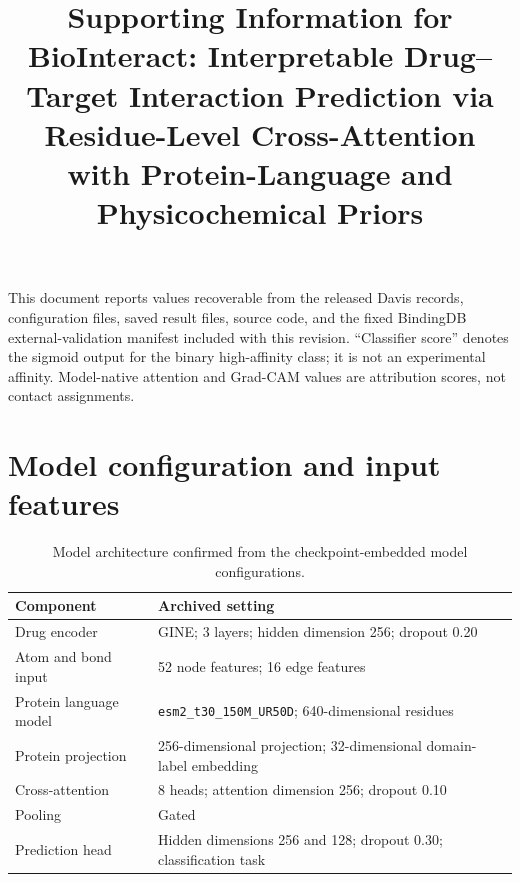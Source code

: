\documentclass[11pt]{article}
\title{Supporting Information for\\
BioInteract: Interpretable Drug--Target Interaction Prediction via Residue-Level Cross-Attention with Protein-Language and Physicochemical Priors}
\author{ }
\date{ }
\begin{document}
\maketitle

\noindent This document reports values recoverable from the released Davis
records, configuration files, saved result files, source code, and the fixed
BindingDB external-validation manifest included with this revision. ``Classifier
score'' denotes the sigmoid output for the binary high-affinity class; it is not
an experimental affinity. Model-native attention and Grad-CAM values are
attribution scores, not contact assignments.

\section*{Model configuration and input features}

\begin{table}[H]
\centering
\caption{Model architecture confirmed from the checkpoint-embedded model configurations.}
\begin{tabular}{ll}
\toprule
Component & Archived setting \\
\midrule
Drug encoder & GINE; 3 layers; hidden dimension 256; dropout 0.20 \\
Atom and bond input & 52 node features; 16 edge features \\
Protein language model & \texttt{esm2\_t30\_150M\_UR50D}; 640-dimensional residues \\
Protein projection & 256-dimensional projection; 32-dimensional domain-label embedding \\
Cross-attention & 8 heads; attention dimension 256; dropout 0.10 \\
Pooling & Gated \\
Prediction head & Hidden dimensions 256 and 128; dropout 0.30; classification task \\
\bottomrule
\end{tabular}
\end{table}
\end{document}
